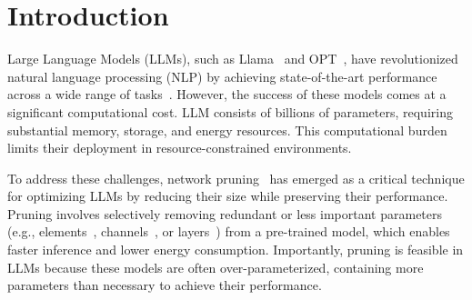 \section{Introduction}

Large Language Models (LLMs), such as Llama~\cite{llama2} and OPT~\cite{opt}, have revolutionized natural language processing (NLP) by achieving state-of-the-art performance across a wide range of tasks~\cite{llama, opt, bloom, palm, lamda, glm, palm}.
However, the success of these models comes at a significant computational cost. 
LLM consists of billions of parameters, requiring substantial memory, storage, and energy resources. 
This computational burden limits their deployment in resource-constrained environments. 

To address these challenges, network pruning~\cite{lecun_prun} has emerged as a critical technique for optimizing LLMs by reducing their size while preserving their performance.
Pruning involves selectively removing redundant or less important parameters (e.g., elements~\cite{wanda}, channels~\cite{slicegpt}, or layers~\cite{sleb}) from a pre-trained model, which enables faster inference and lower energy consumption. 
Importantly, pruning is feasible in LLMs because these models are often over-parameterized, containing more parameters than necessary to achieve their performance.


